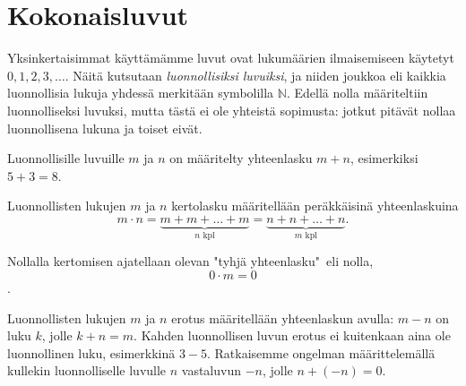 
% 
% 
% 


% 
% 
% 

\chapter{Kokonaisluvut}

Yksinkertaisimmat käyttämämme luvut ovat lukumäärien ilmaisemiseen käytetyt $0, 1, 2, 3, \ldots$. Näitä kutsutaan \emph{luonnollisiksi luvuiksi}, ja niiden joukkoa eli kaikkia luonnollisia lukuja yhdessä merkitään symbolilla $\mathbb{N}$. Edellä nolla määriteltiin luonnolliseksi luvuksi, mutta tästä
ei ole yhteistä sopimusta: jotkut pitävät nollaa luonnollisena lukuna ja
toiset eivät.

Luonnollisille luvuille $m$ ja $n$ on määritelty yhteenlasku $m + n$, esimerkiksi $5 + 3 = 8$.

Luonnollisten lukujen $m$ ja $n$ kertolasku määritellään peräkkäisinä yhteenlaskuina
\[m \cdot n = \underbrace{m + m + \ldots + m}_{n\text{ kpl}} = \underbrace{n + n + \ldots + n}_{m\text{ kpl}}.\]

Nollalla kertomisen ajatellaan olevan "tyhjä yhteenlasku"\ eli nolla,
\[0 \cdot m = 0\].

Luonnollisten lukujen $m$ ja $n$ erotus määritellään yhteenlaskun avulla:
$m-n$ on luku $k$, jolle $k + n = m$. Kahden luonnollisen luvun erotus
ei kuitenkaan aina ole luonnollinen luku, esimerkkinä $3 - 5$.
Ratkaisemme ongelman määrittelemällä kullekin luonnolliselle
luvulle $n$ vastaluvun $-n$, jolle $n + (-n) = 0$.

